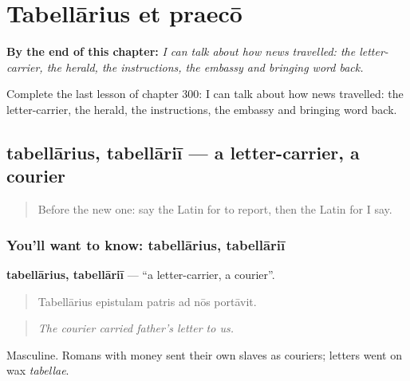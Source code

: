 
\chapter{Tabellārius et praecō}
\label{ch:la-tabellarius-et-praeco}

\begin{chapteropening}
\textbf{By the end of this chapter:} \emph{I can talk about how news travelled: the letter-carrier, the herald, the instructions, the embassy and bringing word back.}

Complete the last lesson of chapter 300: I can talk about how news travelled: the letter-carrier, the herald, the instructions, the embassy and bringing word back.
\end{chapteropening}

\section[tabellārius, tabellāriī]{tabellārius, tabellāriī — a letter-carrier, a courier}

\label{lesson:LA-C300-tabellarius}



\begin{quote}
Before the new one: say the Latin for to report, then the Latin for I say.
\end{quote}

\subsection*{You'll want to know: tabellārius, tabellāriī}
\textbf{tabellārius, tabellāriī} — \textquotedblleft{}a letter-carrier, a courier\textquotedblright{}.

\begin{quote}
Tabellārius epistulam patris ad nōs portāvit.
\end{quote}

\begin{quote}
\emph{The courier carried father's letter to us.}
\end{quote}

Masculine. Romans with money sent their own slaves as couriers; letters went on wax \emph{tabellae}.

